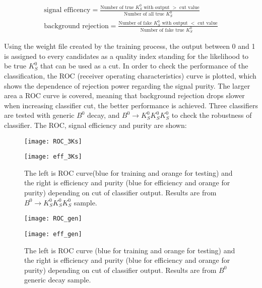 \begin{eqnarray}
	\text{signal efficency} = \frac{\text{Number of true $K_S^0$ with output $>$ cut value}}{\text{Number of all true $K_S^0$ }} \\
	\text{background rejection} = \frac{\text{Number of fake $K_S^0$ with output $<$ cut value}}{\text{Number of fake true $K_S^0$ }}
\end{eqnarray}

Using the weight file created by the training process, the output between 0 and 1 is assigned to every candidates as a quality index standing for the likelihood to be true $K_S^0$ that can be used as a cut. In order to check the performance of the classification, the ROC (receiver operating characteristics) curve is plotted, which shows the dependence of rejection power regarding the signal purity. The larger area a ROC curve is covered, meaning that background rejection drops slower when increasing classifier cut, the better performance is achieved. Three classifiers are tested with generic $B^0$ decay, and $B^0 \to K_S^0  K_S^0  K_S^0$ to check the robustness of classifier. The ROC, signal efficiency and purity are shown: 

\begin{figure}[H]
	\begin{minipage}[b]{0.5\linewidth}
		\centering 
		\texttt{[image: ROC\_3Ks]}
		\label{fig:side:a}
	\end{minipage}
	\begin{minipage}[b]{0.5\linewidth}
		\centering 
		\texttt{[image: eff\_3Ks]}
		\label{fig:side:b}
	\end{minipage}
\caption{The left is ROC curve(blue for training and orange for testing) and the right is efficiency and purity (blue for efficiency and orange for purity) depending on cut of classifier output. Results are from $B^0 \to K_S^0  K_S^0  K_S^0$ sample.}
\end{figure}

\begin{figure}[H]
	\begin{minipage}[b]{0.5\linewidth}
		\centering 
		\texttt{[image: ROC\_gen]}
		\label{fig:side:a}
	\end{minipage}
	\begin{minipage}[b]{0.5\linewidth}
		\centering 
		\texttt{[image: eff\_gen]}
		\label{fig:side:b}
	\end{minipage}
	\caption{The left is ROC curve (blue for training and orange for testing) and the right is efficiency and purity (blue for efficiency and orange for purity) depending on cut of classifier output. Results are from $B^0$ generic decay sample.}
\end{figure}

